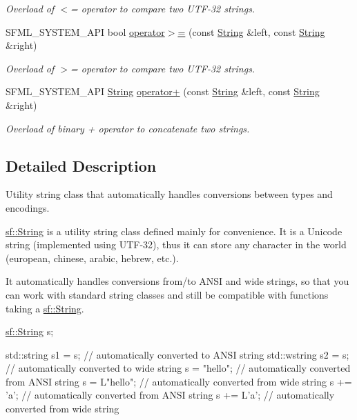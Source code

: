 \begin{DoxyCompactItemize}
\begin{DoxyCompactList}\small\item\em Overload of $<$= operator to compare two U\-T\-F-\/32 strings. \end{DoxyCompactList}\item 
S\-F\-M\-L\-\_\-\-S\-Y\-S\-T\-E\-M\-\_\-\-A\-P\-I bool \hyperlink{classsf_1_1String_a8d2979d7829d6616330a768956f251e1}{operator$>$=} (const \hyperlink{classsf_1_1String}{String} \&left, const \hyperlink{classsf_1_1String}{String} \&right)
\begin{DoxyCompactList}\small\item\em Overload of $>$= operator to compare two U\-T\-F-\/32 strings. \end{DoxyCompactList}\item 
S\-F\-M\-L\-\_\-\-S\-Y\-S\-T\-E\-M\-\_\-\-A\-P\-I \hyperlink{classsf_1_1String}{String} \hyperlink{classsf_1_1String_a55ef2bf7dc6b295ef7127b0bc1e58760}{operator+} (const \hyperlink{classsf_1_1String}{String} \&left, const \hyperlink{classsf_1_1String}{String} \&right)
\begin{DoxyCompactList}\small\item\em Overload of binary + operator to concatenate two strings. \end{DoxyCompactList}\end{DoxyCompactItemize}


\subsection{Detailed Description}
Utility string class that automatically handles conversions between types and encodings. 

\hyperlink{classsf_1_1String}{sf\-::\-String} is a utility string class defined mainly for convenience. It is a Unicode string (implemented using U\-T\-F-\/32), thus it can store any character in the world (european, chinese, arabic, hebrew, etc.).

It automatically handles conversions from/to A\-N\-S\-I and wide strings, so that you can work with standard string classes and still be compatible with functions taking a \hyperlink{classsf_1_1String}{sf\-::\-String}.


\begin{DoxyCode}
\hyperlink{classsf_1_1String}{sf::String} s;

std::string s1 = s;  \textcolor{comment}{// automatically converted to ANSI string}
std::wstring s2 = s; \textcolor{comment}{// automatically converted to wide string}
s = \textcolor{stringliteral}{"hello"};         \textcolor{comment}{// automatically converted from ANSI string}
s = L\textcolor{stringliteral}{"hello"};        \textcolor{comment}{// automatically converted from wide string}
s += \textcolor{charliteral}{'a'};            \textcolor{comment}{// automatically converted from ANSI string}
s += L\textcolor{charliteral}{'a'};           \textcolor{comment}{// automatically converted from wide string}
\end{DoxyCode}



